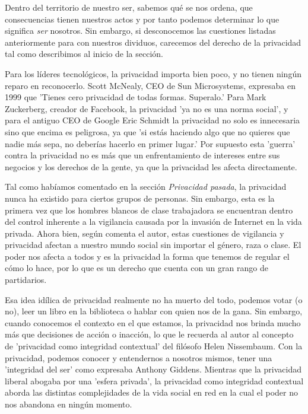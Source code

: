 \documentclass[11pt]{article}
\begin{document}
Dentro del territorio de nuestro ser, sabemos qué se nos ordena, que consecuencias tienen nuestros actos y por tanto podemos determinar lo que significa \textit{ser} nosotros. Sin embargo, si desconocemos las cuestiones listadas anteriormente para con nuestros dividuos, carecemos del derecho de la privacidad tal como describimos al inicio de la sección.

Para los líderes tecnológicos, la privacidad importa bien poco, y no tienen ningún reparo en reconocerlo. Scott McNealy, CEO de Sun Microsystems, expresaba en 1999 que 'Tienes cero privacidad de todas formas. Superalo.' Para Mark Zuckerberg, creador de Facebook, la privacidad 'ya no es una norma social', y para el antiguo CEO de Google Eric Schmidt la privacidad no solo es innecesaria sino que encima es peligrosa, ya que 'si estás haciendo algo que no quieres que nadie más sepa, no deberías hacerlo en primer lugar.' Por supuesto esta 'guerra' contra la privacidad no es más que un enfrentamiento de intereses entre sus negocios y los derechos de la gente, ya que la privacidad les afecta directamente.

Tal como habíamos comentado en la sección \textit{Privacidad pasada}, la privacidad nunca ha existido para ciertos grupos de personas. Sin embargo, esta es la primera vez que los hombres blancos de clase trabajadora se encuentran dentro del control inherente a la vigilancia causada por la invasión de Internet en la vida privada. Ahora bien, según comenta el autor, estas cuestiones de vigilancia y privacidad afectan a nuestro mundo social sin importar el género, raza o clase. El poder nos afecta a todos y es la privacidad la forma que tenemos de regular el cómo lo hace, por lo que es un derecho que cuenta con un gran rango de partidarios.

Esa idea idílica de privacidad realmente no ha muerto del todo, podemos votar (o no), leer un libro en la biblioteca o hablar con quien nos de la gana. Sin embargo, cuando conocemos el contexto en el que estamos, la privacidad nos brinda mucho más que decisiones de acción o inacción, lo que le recuerda al autor al concepto de 'privacidad como integridad contextual' del filósofo Helen Nissembaum. Con la privacidad, podemos conocer y entendernos a nosotros mismos, tener una 'integridad del ser' como expresaba Anthony Giddens. Mientras que la privacidad liberal abogaba por una 'esfera privada', la privacidad como integridad contextual aborda las distintas complejidades de la vida social en red en la cual el poder no nos abandona en ningún momento.
\end{document}
